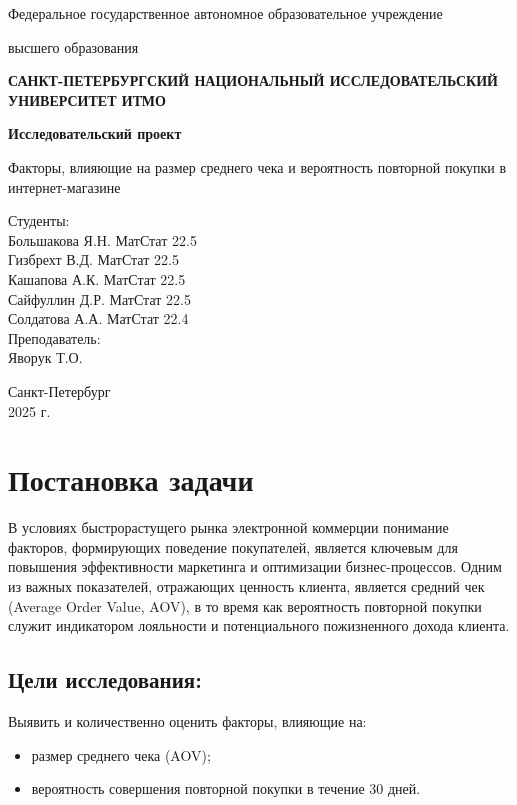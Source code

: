 \documentclass[a4paper]{article}
\begin{document}
\begin{titlepage}
    \centering
    {\large Федеральное государственное автономное образовательное учреждение\par}
    {\large высшего образования\par}
    {\bfseries САНКТ-ПЕТЕРБУРГСКИЙ НАЦИОНАЛЬНЫЙ ИССЛЕДОВАТЕЛЬСКИЙ УНИВЕРСИТЕТ ИТМО\par}
    \vfill
    {\Large \bfseries Исследовательский проект \par}
    {\Large Факторы, влияющие на размер среднего чека и вероятность повторной покупки в интернет-магазине \par}
    \vfill
    
    \begin{flushright}
        Студенты: \\
            Большакова Я.Н. МатСтат 22.5 \\
            Гизбрехт В.Д. МатСтат 22.5 \\
            Кашапова А.К. МатСтат 22.5 \\
            Сайфуллин Д.Р. МатСтат 22.5 \\
            Солдатова А.А. МатСтат 22.4 \\
        Преподаватель: \\
            Яворук Т.О.\\
    \end{flushright}
    \vfill
    Санкт-Петербург \\
    2025 г.
\end{titlepage}

\tableofcontents
\newpage

\section{Постановка задачи}
В условиях быстрорастущего рынка электронной коммерции понимание факторов, формирующих поведение покупателей, является ключевым для повышения эффективности маркетинга и оптимизации бизнес-процессов. Одним из важных показателей, отражающих ценность клиента, является средний чек (Average Order Value, AOV), в то время как вероятность повторной покупки служит индикатором лояльности и потенциального пожизненного дохода клиента.


\subsection*{Цели исследования:}
Выявить и количественно оценить факторы, влияющие на:
\begin{itemize}
  \item размер среднего чека (AOV);
  \item вероятность совершения повторной покупки в течение 30 дней.
\end{itemize}
\end{document}

